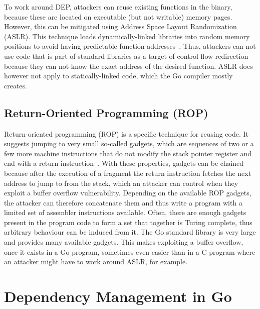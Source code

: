 To work around \acrshort{DEP}, attackers can reuse existing functions in the binary, because these are located on
executable (but not writable) memory pages.
However, this can be mitigated using Address Space Layout Randomization (\acrshort{ASLR}).
This technique loads dynamically-linked libraries into random memory positions to avoid having predictable function
addresses~\cite{marco2014}.
Thus, attackers can not use code that is part of standard libraries as a target of control flow redirection because
they can not know the exact address of the desired function.
\acrshort{ASLR} does however not apply to statically-linked code, which the Go compiler mostly creates.



\subsection{Return-Oriented Programming (ROP)}\label{subsec:background:exploit-techniques:rop}

Return-oriented programming (\acrshort{ROP}) is a specific technique for reusing code.
It suggests jumping to very small so-called gadgets, which are sequences of two or a few more machine instructions that
do not modify the stack pointer register and end with a return instruction~\cite{roemer2012}.
With these properties, gadgets can be chained because after the execution of a fragment the return instruction fetches
the next address to jump to from the stack, which an attacker can control when they exploit a buffer overflow
vulnerability.
Depending on the available \acrshort{ROP} gadgets, the attacker can therefore concatenate them and thus write a program
with a limited set of assembler instructions available.
Often, there are enough gadgets present in the program code to form a set that together is Turing complete, thus
arbitrary behaviour can be induced from it.
The Go standard library is very large and provides many available gadgets.
This makes exploiting a buffer overflow, once it exists in a Go program, sometimes even easier than in a C program where
an attacker might have to work around \acrshort{ASLR}, for example.



\section{Dependency Management in Go}\label{sec:background:dependencies}

